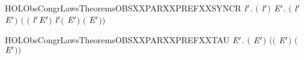 \newcommand{\HOLObsCongrLawsTheoremsOBSXXPARXXPREFXXNOXXSYNCR}{\UseVerbatim{HOLObsCongrLawsTheoremsOBSXXPARXXPREFXXNOXXSYNCR}}
\begin{SaveVerbatim}{HOLObsCongrLawsTheoremsOBSXXPARXXPREFXXSYNCR}
\HOLTokenTurnstile{} \HOLSymConst{\HOLTokenForall{}} \ensuremath{\HOLBoundVar{l}\sp{\prime}}.
       \ensuremath{(} \HOLSymConst{\ensuremath{=}}  \ensuremath{\HOLBoundVar{l}\sp{\prime}}\ensuremath{)} \HOLSymConst{\HOLTokenImp{}}
       \HOLSymConst{\HOLTokenForall{}} \ensuremath{\HOLBoundVar{E}\sp{\prime}}.
            \ensuremath{(} \HOLSymConst{\ensuremath{\ldotp}} \HOLSymConst{\ensuremath{\mid}}  \ensuremath{\HOLBoundVar{l}\sp{\prime}}\HOLSymConst{\ensuremath{\ldotp}}\ensuremath{\HOLBoundVar{E}\sp{\prime}}\ensuremath{)}
             \ensuremath{(} \HOLSymConst{\ensuremath{\ldotp}}\ensuremath{(} \HOLSymConst{\ensuremath{\mid}}  \ensuremath{\HOLBoundVar{l}\sp{\prime}}\HOLSymConst{\ensuremath{\ldotp}}\ensuremath{\HOLBoundVar{E}\sp{\prime}}\ensuremath{)} \HOLSymConst{\ensuremath{+}}
               \ensuremath{\HOLBoundVar{l}\sp{\prime}}\HOLSymConst{\ensuremath{\ldotp}}\ensuremath{(} \HOLSymConst{\ensuremath{\ldotp}} \HOLSymConst{\ensuremath{\mid}} \ensuremath{\HOLBoundVar{E}\sp{\prime}}\ensuremath{)} \HOLSymConst{\ensuremath{+}} \HOLConst{\ensuremath{\tau}}\HOLSymConst{\ensuremath{\ldotp}}\ensuremath{(} \HOLSymConst{\ensuremath{\mid}} \ensuremath{\HOLBoundVar{E}\sp{\prime}}\ensuremath{)}\ensuremath{)}
\end{SaveVerbatim}
\newcommand{\HOLObsCongrLawsTheoremsOBSXXPARXXPREFXXSYNCR}{\UseVerbatim{HOLObsCongrLawsTheoremsOBSXXPARXXPREFXXSYNCR}}
\begin{SaveVerbatim}{HOLObsCongrLawsTheoremsOBSXXPARXXPREFXXTAU}
\HOLTokenTurnstile{} \HOLSymConst{\HOLTokenForall{}}  \ensuremath{\HOLBoundVar{E}\sp{\prime}}.  \ensuremath{(}\HOLSymConst{\ensuremath{\ldotp}} \HOLSymConst{\ensuremath{\mid}} \HOLConst{\ensuremath{\tau}}\HOLSymConst{\ensuremath{\ldotp}}\ensuremath{\HOLBoundVar{E}\sp{\prime}}\ensuremath{)} \ensuremath{(}\HOLSymConst{\ensuremath{\ldotp}}\ensuremath{(} \HOLSymConst{\ensuremath{\mid}} \HOLConst{\ensuremath{\tau}}\HOLSymConst{\ensuremath{\ldotp}}\ensuremath{\HOLBoundVar{E}\sp{\prime}}\ensuremath{)} \HOLSymConst{\ensuremath{+}} \HOLConst{\ensuremath{\tau}}\HOLSymConst{\ensuremath{\ldotp}}\ensuremath{(}\HOLSymConst{\ensuremath{\ldotp}} \HOLSymConst{\ensuremath{\mid}} \ensuremath{\HOLBoundVar{E}\sp{\prime}}\ensuremath{)}\ensuremath{)}
\end{SaveVerbatim}
